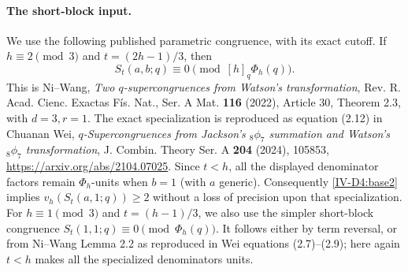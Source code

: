 \documentclass[11pt,letterpaper]{article}
\numberwithin{equation}{section}
\begin{document}
\paragraph{The short-block input.}
We use the following published parametric congruence, with its exact
cutoff.  If $h\equiv2\pmod3$ and $t=(2h-1)/3$, then
\begin{equation}\label{IV-D4:base2}
 S_t(a,b;q)\equiv0\pmod{[h]_q\Phi_h(q)}.
\end{equation}
This is Ni--Wang, \emph{Two $q$-supercongruences from Watson's
transformation}, Rev. R. Acad. Cienc. Exactas F\'is. Nat., Ser. A Mat.
\textbf{116} (2022), Article 30, Theorem 2.3, with $d=3,r=1$.
The exact specialization is reproduced as equation (2.12) in
Chuanan Wei, \emph{$q$-Supercongruences from Jackson's ${}_8\phi_7$
summation and Watson's ${}_8\phi_7$ transformation}, J. Combin.
Theory Ser. A \textbf{204} (2024), 105853,
\url{https://arxiv.org/abs/2104.07025}.
Since $t<h$, all the displayed denominator factors remain
$\Phi_h$-units when $b=1$ (with $a$ generic).  Consequently
\eqref{IV-D4:base2} implies $v_h(S_t(a,1;q))\ge2$ without a loss of
precision upon that specialization.
For $h\equiv1\pmod3$ and $t=(h-1)/3$, we also use the simpler
short-block congruence $S_t(1,1;q)\equiv0\pmod{\Phi_h(q)}$.
It follows either by term reversal, or from Ni--Wang Lemma 2.2 as
reproduced in Wei equations (2.7)--(2.9); here again $t<h$ makes
all the specialized denominators units.
\end{document}
